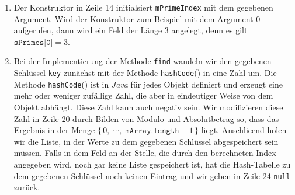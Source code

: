 \begin{enumerate}
\begin{enumerate}
            Theoretische Untersuchungen, die \"uber den Rahmen der Vorlesung hinausgehen, zeigen, dass
            die Gr\"o\3e der Tabelle eine Primzahl sein sollte.  Daher verf\"ugt der
            Konstruktor \"uber eine Liste von Primzahlen, 
            die in der statistischen Member-Variablen \texttt{sPrimes}, die in Zeile 4
            definiert ist, abgelegt sind.  
            Die $i+1$-te Primzahlen in dieser Liste ist in etwa doppelt so gro\3 wie die $i$-te
            Primzahl. Die Member-Variable \texttt{mPrimeIndex}, die
            in Zeile 11 definiert wird, kodiert nun die Gr\"o\3e des
            Feldes \texttt{mArray}.  Es gilt immer \\[0.2cm]
            \hspace*{1.3cm} \texttt{mArray.length == sPrimes[mPrimeIndex]}. \\[0.2cm]
            Die durchschnittliche L\"ange der einzelnen Listen ergibt sich als
            der Quotient aus der Zahl \texttt{mNumberEntries} und der L\"ange des Feldes
            \texttt{mArray}.  Wird nun dieser Wert gr\"o\3er als der
            \emph{Auslastungs-Faktor} (engl.~\emph{load factor})             
            \texttt{sAlpha}, der in Zeile 3 definiert ist, dann verdoppeln wir die Gr\"o\3e
            des Feldes.
      \end{enumerate}
\item Der Konstruktor in Zeile 14 initialsiert \texttt{mPrimeIndex} mit dem gegebenen Argument.
      Wird der Konstruktor zum Beispiel mit dem Argument 0 aufgerufen, dann wird ein Feld
      der L\"ange 3 angelegt, denn es gilt $\texttt{sPrimes[0]} = 3$.
\item Bei der Implementierung der Methode \texttt{find} wandeln wir den gegebenen Schl\"ussel 
      \texttt{key} zun\"achst mit der Methode \texttt{hashCode}() in eine Zahl um.  
      Die Methode \texttt{hashCode}() ist in \textsl{Java} f\"ur jedes Objekt definiert
      und erzeugt eine mehr oder weniger zuf\"allige Zahl, die aber in eindeutiger Weise
      von dem Objekt abh\"angt.  Diese Zahl kann auch negativ sein.
      Wir modifizieren diese Zahl in Zeile 20 durch Bilden von Modulo und Absolutbetrag
      so, dass das Ergebnis in der Menge 
      $\{\,0,\; \cdots,\; \mathtt{mArray.length} - 1\,\}$ liegt.
      Anschlie\3end holen wir die Liste, in der Werte zu dem gegebenen Schl\"ussel
      abgespeichert sein m\"ussen.  Falls in dem Feld an der Stelle, die durch den berechneten 
      Index angegeben wird, noch gar keine Liste gespeichert ist,
      hat die Hash-Tabelle zu dem gegebenen Schl\"ussel noch keinen Eintrag und wir geben in
      Zeile 24 \texttt{null} zur\"uck.


\end{enumerate}
